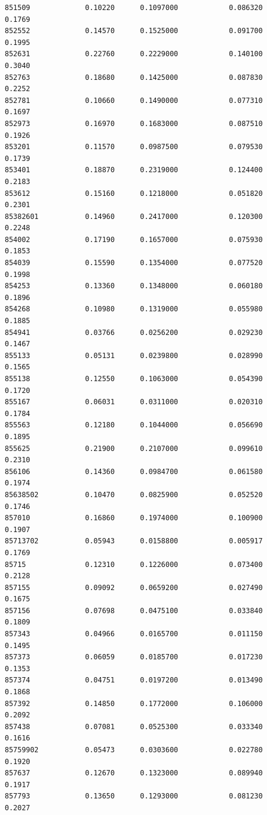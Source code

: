 \documentclass[
  letterpaper,
  DIV=11,
  numbers=noendperiod]{scrartcl}
\begin{document}
\begin{verbatim}
851509             0.10220      0.1097000            0.086320        0.1769
852552             0.14570      0.1525000            0.091700        0.1995
852631             0.22760      0.2229000            0.140100        0.3040
852763             0.18680      0.1425000            0.087830        0.2252
852781             0.10660      0.1490000            0.077310        0.1697
852973             0.16970      0.1683000            0.087510        0.1926
853201             0.11570      0.0987500            0.079530        0.1739
853401             0.18870      0.2319000            0.124400        0.2183
853612             0.15160      0.1218000            0.051820        0.2301
85382601           0.14960      0.2417000            0.120300        0.2248
854002             0.17190      0.1657000            0.075930        0.1853
854039             0.15590      0.1354000            0.077520        0.1998
854253             0.13360      0.1348000            0.060180        0.1896
854268             0.10980      0.1319000            0.055980        0.1885
854941             0.03766      0.0256200            0.029230        0.1467
855133             0.05131      0.0239800            0.028990        0.1565
855138             0.12550      0.1063000            0.054390        0.1720
855167             0.06031      0.0311000            0.020310        0.1784
855563             0.12180      0.1044000            0.056690        0.1895
855625             0.21900      0.2107000            0.099610        0.2310
856106             0.14360      0.0984700            0.061580        0.1974
85638502           0.10470      0.0825900            0.052520        0.1746
857010             0.16860      0.1974000            0.100900        0.1907
85713702           0.05943      0.0158800            0.005917        0.1769
85715              0.12310      0.1226000            0.073400        0.2128
857155             0.09092      0.0659200            0.027490        0.1675
857156             0.07698      0.0475100            0.033840        0.1809
857343             0.04966      0.0165700            0.011150        0.1495
857373             0.06059      0.0185700            0.017230        0.1353
857374             0.04751      0.0197200            0.013490        0.1868
857392             0.14850      0.1772000            0.106000        0.2092
857438             0.07081      0.0525300            0.033340        0.1616
85759902           0.05473      0.0303600            0.022780        0.1920
857637             0.12670      0.1323000            0.089940        0.1917
857793             0.13650      0.1293000            0.081230        0.2027

\end{verbatim}
\end{document}
